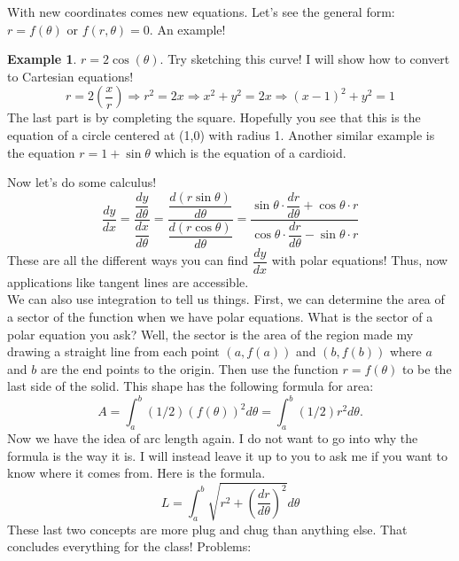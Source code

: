 \documentclass[10pt]{article}
\theoremstyle{Theorem}
\theoremstyle{definition}
\newtheorem{ex}{Example}[section]
\theoremstyle{remark}
\theoremstyle{custom}
\begin{document}
With new coordinates comes new equations. Let's see the general form: $r=f(\theta)$ or $f(r,\theta)=0$. An example!
\begin{ex}
$r=2\cos(\theta)$. Try sketching this curve! I will show how to convert to Cartesian equations! 
\[
r=2\left(\dfrac{x}{r}\right) \Rightarrow r^2=2x \Rightarrow x^2+y^2=2x \Rightarrow (x-1)^2+y^2=1
\]
The last part is by completing the square. Hopefully you see that this is the equation of a circle centered at (1,0) with radius 1.  Another similar example is the equation $r=1+\sin\theta$ which is the equation of a cardioid.
\end{ex}
Now let's do some calculus! 
\[
\dfrac{dy}{dx}=\dfrac{\dfrac{dy}{d\theta}}{\dfrac{dx}{d\theta}}=\dfrac{\dfrac{d(r\sin\theta)}{d\theta}}{\dfrac{d(r\cos\theta)}{d\theta}}=\dfrac{\sin\theta \cdot\dfrac{dr}{d\theta}+\cos\theta \cdot r }{\cos\theta \cdot \dfrac{dr}{d\theta}-\sin\theta \cdot r}
\]
These are all the different ways you can find $\dfrac{dy}{dx}$ with polar equations! Thus, now applications like tangent lines are accessible.\\
We can also use integration to tell us things. First, we can determine the area of a sector of the function when we have polar equations. What is the sector of a polar equation you ask? Well, the sector is the area of the region made my drawing a straight line from each point $(a,f(a))$ and $(b,f(b))$ where $a$ and $b$ are the end points to the origin. Then use the function $r=f(\theta)$ to be the last side of the solid. This shape has the following formula for area:
\[
A=\int_a^b (1/2)(f(\theta))^2 d\theta=\int_a^b(1/2)r^2d\theta.
\]
Now we have the idea of arc length again. I do not want to go into why the formula is the way it is. I will instead leave it up to you to ask me if you want to know where it comes from.  Here is the formula. 
\[
L=\int_a^b \sqrt{r^2+\left(\dfrac{dr}{d\theta}\right)^2}d\theta
\]
These last two concepts are more plug and chug than anything else. That concludes everything for the class! 
\newpage
\noindent Problems:
\end{document}
